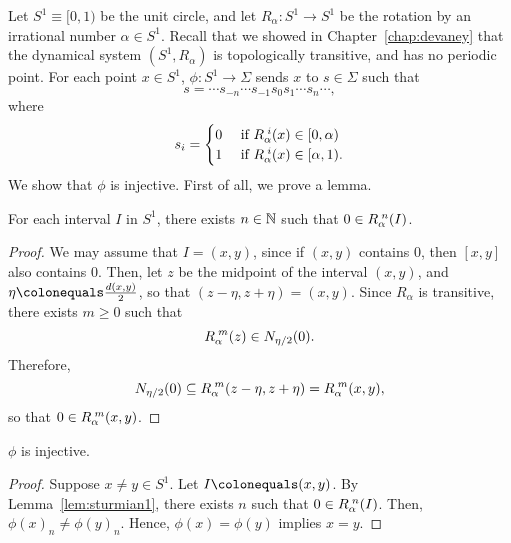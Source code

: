 \documentclass[10pt,twoside,draft]{book}
\begin{document}
\begin{example}
  Let $S^1 \equiv [0, 1)$ be the unit circle, and let $R_\alpha: S^1 \to S^1$ be the rotation by an irrational number $\alpha \in S^1$. %
  Recall that we showed in Chapter~\ref{chap:devaney} that the dynamical system $(S^1, R_\alpha)$ is topologically transitive, and has no periodic point.
  For each point $x \in S^1$, $\phi: S^1 \to \Sigma$ sends $x$ to $s \in \Sigma$ such that
  \begin{equation*}
    s = \cdots s_{-n} \cdots s_{-1} s_0 s_1 \cdots s_n \cdots,
  \end{equation*}
  where
  \begin{equation*}
    s_i = \begin{cases}
      0& \mbox{ if } \itr{R_\alpha}{i}(x) \in [0, \alpha)  \\ %
      1& \mbox{ if } \itr{R_\alpha}{i}(x) \in [\alpha, 1). %
    \end{cases}
  \end{equation*} %
  We show that $\phi$ is injective.
  First of all, we prove a lemma.
  \begin{lemma}
    For each interval $I$ in $S^1$, there exists $n \in \mathbb{N}$ such that $0 \in R_\alpha^{\;n}(I)$.
    \label{lem:sturmian1}
    \begin{proof}
      We may assume that $I = (x,y)$, since if $(x,y)$ contains $0$, then $[x,y]$ also contains $0$.
      Then, let $z$ be the midpoint of the interval $(x,y)$, and $\eta \ceq \frac{\metric{x,y}}{2}$, so that $(z-\eta, z+\eta) = (x,y)$.
      Since $R_\alpha$ is transitive, there exists $m \geq 0$ such that 
      \begin{equation*}
        R_\alpha^{\;m}(z) \in N_{\eta/2}(0).
      \end{equation*}
      Therefore,
      \begin{equation*}
        N_{\eta/2}(0) \subseteq R_\alpha^{\;m}(z-\eta, z+\eta) 
        = R_\alpha^{\;m}(x,y),
      \end{equation*}
      so that $0 \in R_\alpha^{\;m}(x,y)$.
    \end{proof}
  \end{lemma}
  \begin{proposition}
    $\phi$ is injective.
    \begin{proof}
      Suppose $x \neq y \in S^1$.
      Let $I \ceq (x,y)$.
      By Lemma~\ref{lem:sturmian1}, there exists $n$ such that $0 \in R_\alpha^{\;n}(I)$.
      Then, $\phi(x)_n \neq \phi(y)_n$.
      Hence, $\phi(x) = \phi(y)$ implies $x = y$.
    \end{proof}

\end{proposition}
\end{example}
\end{document}
